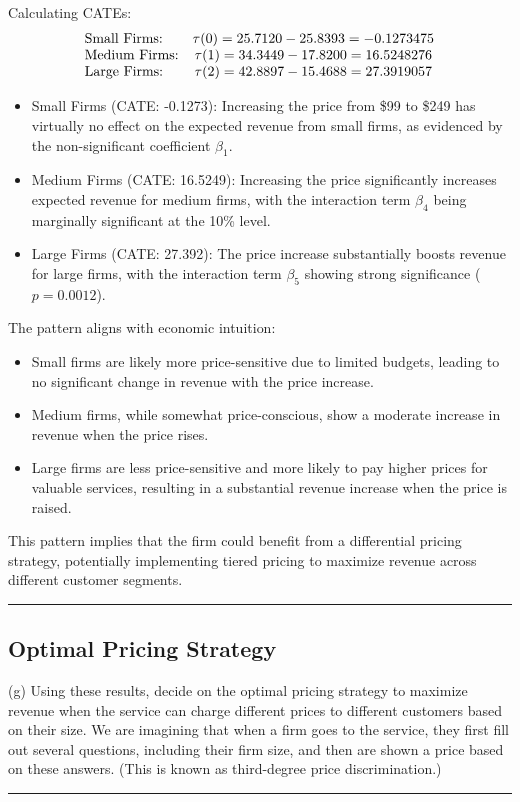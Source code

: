 \documentclass{article}
\newenvironment{colorparagraph}[1]{\par\color{#1}}{\par}
\begin{document}
Calculating CATEs:
\[
\begin{array}{l c}
\text{Small Firms:} & \tau(0) = 25.7120 - 25.8393 = -0.1273475 \\
\text{Medium Firms:} & \tau(1) = 34.3449 - 17.8200 = 16.5248276 \\
\text{Large Firms:} & \tau(2) = 42.8897 - 15.4688 = 27.3919057 \\
\end{array}
\]

\begin{itemize}
    \item Small Firms (CATE: -0.1273): Increasing the price from \$99 to \$249 has virtually no effect on the expected revenue from small firms, as evidenced by the non-significant coefficient \(\beta_1\).
    \item Medium Firms (CATE: 16.5249): Increasing the price significantly increases expected revenue for medium firms, with the interaction term \(\beta_4\) being marginally significant at the 10\% level.
    \item Large Firms (CATE: 27.392): The price increase substantially boosts revenue for large firms, with the interaction term \(\beta_5\) showing strong significance (\(p = 0.0012\)).
\end{itemize}

The pattern aligns with economic intuition:

\begin{itemize}
    \item Small firms are likely more price-sensitive due to limited budgets, leading to no significant change in revenue with the price increase.
    \item Medium firms, while somewhat price-conscious, show a moderate increase in revenue when the price rises.
    \item Large firms are less price-sensitive and more likely to pay higher prices for valuable services, resulting in a substantial revenue increase when the price is raised.
\end{itemize}

This pattern implies that the firm could benefit from a differential pricing strategy, potentially implementing tiered pricing to maximize revenue across different customer segments.

\begin{colorparagraph}{questioncolor}
\rule{\textwidth}{0.5pt}

\label{q3g}\subsection{Optimal Pricing Strategy}
(g) Using these results, decide on the optimal pricing strategy to maximize revenue when the service can charge different prices to different customers based on their size. We are imagining that when a firm goes to the service, they first fill out several questions, including their firm size, and then are shown a price based on these answers. (This is known as third-degree price discrimination.)

\rule{\textwidth}{0.5pt}
\end{colorparagraph}
\end{document}
